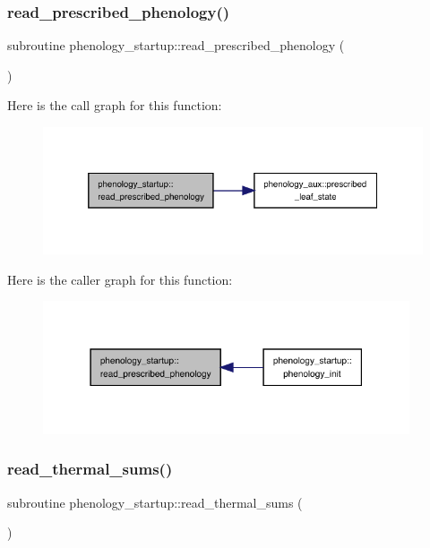 \subsubsection{\texorpdfstring{read\+\_\+prescribed\+\_\+phenology()}{read\_prescribed\_phenology()}}
{\footnotesize\ttfamily subroutine phenology\+\_\+startup\+::read\+\_\+prescribed\+\_\+phenology (\begin{DoxyParamCaption}{ }\end{DoxyParamCaption})}

Here is the call graph for this function\+:
\nopagebreak
\begin{figure}[H]
\begin{center}
\leavevmode
\includegraphics[width=332pt]{namespacephenology__startup_aa83586e75a022d6fcb5816972361282d_cgraph}
\end{center}
\end{figure}
Here is the caller graph for this function\+:
\nopagebreak
\begin{figure}[H]
\begin{center}
\leavevmode
\includegraphics[width=307pt]{namespacephenology__startup_aa83586e75a022d6fcb5816972361282d_icgraph}
\end{center}
\end{figure}
\mbox{\label{namespacephenology__startup_aca2b4422c059ad87aee0f7aa7f7c8964}} 
\subsubsection{\texorpdfstring{read\+\_\+thermal\+\_\+sums()}{read\_thermal\_sums()}}
{\footnotesize\ttfamily subroutine phenology\+\_\+startup\+::read\+\_\+thermal\+\_\+sums (\begin{DoxyParamCaption}{ }\end{DoxyParamCaption})}

